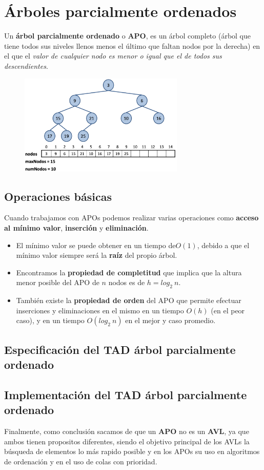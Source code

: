 \chapter{Árboles parcialmente ordenados}
Un \textbf{árbol parcialmente ordenado} o \textbf{APO}, es un árbol completo (árbol que tiene todos sus niveles llenos menos el último que faltan nodos por la derecha) en el que el \textit{valor de cualquier nodo es menor o igual que el de todos sus descendientes}. 
\begin{figure}[h]
  \begin{center}
    \includegraphics[width=0.7\textwidth]{assets/apo1.png}
  \end{center}
\end{figure}
\section{Operaciones básicas}
Cuando trabajamos con APOs podemos realizar varias operaciones como \textbf{acceso al mínimo valor}, \textbf{inserción} y \textbf{eliminación}.
\begin{itemize}
  \item El mínimo valor se puede obtener en un tiempo de\(O(1)\), debido a que el mínimo valor siempre será la \textbf{raíz} del propio árbol.
  \item Encontramos la \textbf{propiedad de completitud} que implica que la altura menor posible del APO de \(n\) nodos es de \(h = log_{2}\ n\).
  \item También existe la \textbf{propiedad de orden} del APO que permite efectuar inserciones y eliminaciones en el mismo en un tiempo \(O(h)\) (en el peor caso), y en un tiempo \(O(log_{2}\ n)\) en el mejor y caso promedio.
\end{itemize}

\section{Especificación del TAD árbol parcialmente ordenado}

\section{Implementación del TAD árbol parcialmente ordenado}


Finalmente, como conclusión sacamos de que un \textbf{APO} no es un \textbf{AVL}, ya que ambos tienen propositos diferentes, siendo el objetivo principal de los AVLs la búsqueda de elementos lo más rapido posible y en los APOs su uso en algoritmos de ordenación y en el uso de colas con prioridad.
